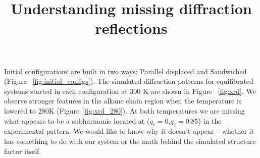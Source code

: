 \documentclass{article}
\title{Understanding missing diffraction reflections}
\begin{document}
\graphicspath{{./figures/}}  %
\maketitle

Initial configurations are built in two ways: Parallel displaced and Sandwiched
(Figure ~\ref{fig:initial_configs}).  The simulated diffraction patterns for
equilibrated systems started in each configuration at 300 K are shown in Figure
~\ref{fig:xrd}. We observe stronger features in the alkane chain region when
the temperature is lowered to 280K (Figure~\ref{fig:xrd_280}). At both
temperatures we are missing what appears to be a subharmonic located at
($q_r=0$,$q_z=0.85$) in the experimental pattern. We would like to know 
why it doesn't appear -- whether it has something to do with our system
or the math behind the simulated structure factor itself. 
\end{document}
